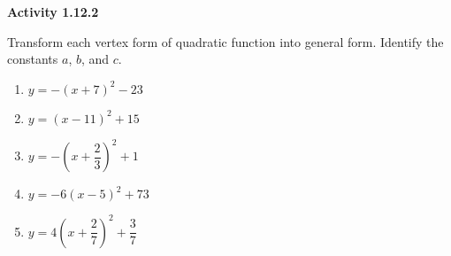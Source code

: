 \vspace{1ex}
\noindent\textbf{Activity 1.12.2}

\vspace{0.75ex}

Transform each vertex form of quadratic function into general form. Identify the 
constants $a$, $b$, and $c$.
\begin{multicols}{2}
\begin{enumerate}[label = \color{blue}\arabic*. ]
\item $ y = -(x + 7)^{2} - 23 $
\item $ y = (x - 11)^{2} + 15 $
\item $ y = -(x + \dfrac{2}{3})^{2} + 1 $
\item $ y = -6(x - 5)^{2} + 73 $
\item $ y = 4(x + \dfrac{2}{7})^{2} + \dfrac{3}{7} $
\end{enumerate}
\end{multicols} 
